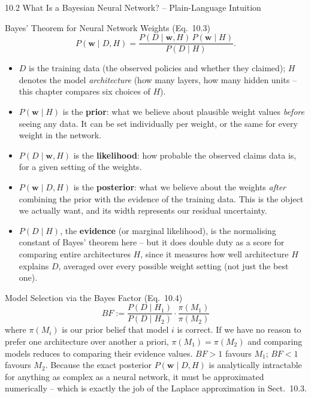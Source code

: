 \documentclass[aspectratio=169,10pt]{beamer}
\newcommand{\bw}{\mathbf{w}}
\begin{document}
\begin{frame}[allowframebreaks]{10.2 What Is a Bayesian Neural Network? -- Plain-Language Intuition}
  \begin{block}{Bayes' Theorem for Neural Network Weights (Eq.\ 10.3)}
    \[
      P(\bw \mid D, H) = \frac{P(D \mid \bw, H)\, P(\bw \mid H)}{P(D \mid H)}.
    \]
    \begin{itemize}
      \item $D$ is the training data (the observed policies and whether they
        claimed); $H$ denotes the model \emph{architecture} (how many
        layers, how many hidden units -- this chapter compares six choices
        of $H$).
      \item $P(\bw \mid H)$ is the \textbf{prior}: what we believe about
        plausible weight values \emph{before} seeing any data. It can be set
        individually per weight, or the same for every weight in the
        network.
      \item $P(D \mid \bw, H)$ is the \textbf{likelihood}: how probable the
        observed claims data is, for a given setting of the weights.
      \item $P(\bw \mid D, H)$ is the \textbf{posterior}: what we believe
        about the weights \emph{after} combining the prior with the evidence
        of the training data. This is the object we actually want, and its
        width represents our residual uncertainty.
      \item $P(D \mid H)$, the \textbf{evidence} (or marginal likelihood), is
        the normalising constant of Bayes' theorem here -- but it does double
        duty as a score for comparing entire architectures $H$, since it
        measures how well architecture $H$ explains $D$, averaged over every
        possible weight setting (not just the best one).
    \end{itemize}
  \end{block}

  \begin{alertblock}{Model Selection via the Bayes Factor (Eq.\ 10.4)}
    \[
      BF := \frac{P(D \mid H_1)}{P(D \mid H_2)} \cdot \frac{\pi(M_1)}{\pi(M_2)}
    \]
    where $\pi(M_i)$ is our prior belief that model $i$ is correct. If we have
    no reason to prefer one architecture over another a priori, $\pi(M_1) =
    \pi(M_2)$ and comparing models reduces to comparing their evidence
    values. $BF > 1$ favours $M_1$; $BF < 1$ favours $M_2$. Because the exact
    posterior $P(\bw \mid D, H)$ is analytically intractable for anything as
    complex as a neural network, it must be approximated numerically --
    which is exactly the job of the Laplace approximation in Sect.\ 10.3.
  \end{alertblock}


\end{frame}
\end{document}

